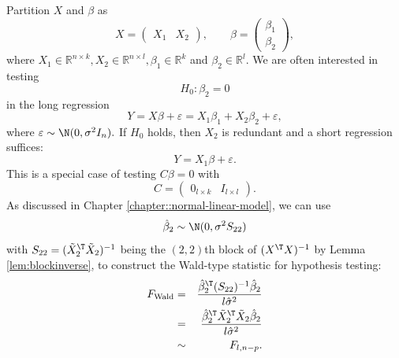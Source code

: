 Partition $X$ and $\beta$ as
\[
X=\left(\begin{array}{cc}
X_{1} & X_{2}\end{array}\right),\qquad\beta=\left(\begin{array}{c}
\beta_{1}\\
\beta_{2}
\end{array}\right),
\]
where $X_{1}\in\mathbb{R}^{n\times k},X_{2}\in\mathbb{R}^{n\times l},\beta_{1}\in\mathbb{R}^{k}$
and $ \beta_2 \in  \mathbb{R}^{l}.$ We are often interested in testing
\[
H_{0}:\beta_{2}=0
\]
in the long regression
\begin{equation}
Y=X\beta+\varepsilon=X_{1}\beta_{1}+X_{2}\beta_{2}+\varepsilon,\label{eq:longreg}
\end{equation}
where $\varepsilon\sim\N(0,\sigma^{2}I_{n}).$ If $H_{0}$ holds,
then $X_{2}$ is redundant and a short regression suffices:
\begin{equation}
Y=X_{1}\beta+\varepsilon. \label{eq:shortreg}
\end{equation}
This is a special case of testing $C\beta=0$
with 
\[
C=\left(\begin{array}{cc}
0_{l\times k} & I_{l\times l}\end{array}\right).
\]
As discussed in Chapter \ref{chapter::normal-linear-model}, we can use 
\[
\hat{\beta}_{2}\sim\N(0,\sigma^{2}S_{22})
\]
with $S_{22} = (\tilde{X}_{2}^{\T}\tilde{X}_{2})^{-1}$ being the $(2,2)$th block of $(X^{\T}X)^{-1}$ by Lemma \ref{lem:blockinverse}, to construct the Wald-type statistic for hypothesis testing:
\begin{eqnarray*}
F_{\text{Wald}}  
&=& \frac{\hat{\beta}_{2}^{\T}(S_{22})^{-1}\hat{\beta}_{2}}{l\hat{\sigma}^{2}}
\\
&=& \frac{\hat{\beta}_{2}^{\T}  \tilde{X}_{2}^{\T}\tilde{X}_{2}  \hat{\beta}_{2}}{l\hat{\sigma}^{2}}
\\
&\sim & F_{l,n-p}.
\end{eqnarray*}



